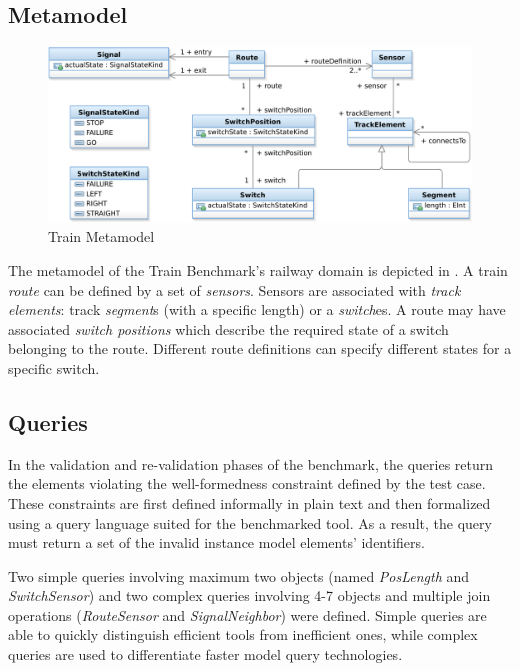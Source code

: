 \subsection{Metamodel}
\label{sec:domain}

\begin{figure}[htb!]
\begin{center}
\includegraphics[width=1\columnwidth]{figures/TrainMM.pdf}
\caption{Train Metamodel}
\label{fig:metamodel}
\end{center}
\end{figure}


The metamodel of the Train Benchmark's railway domain is depicted in . A train \emph{route} can be defined by a set of \emph{sensors}. Sensors are associated with \emph{track elements}: track \emph{segment}s (with a specific length) or a \emph{switch}es. A route may have associated \emph{switch positions} which describe the required state of a switch belonging to the route. Different route definitions can specify different states for a specific switch.
 
\subsection{Queries}
\label{sec:queries}

In the validation and re-validation phases of the benchmark, the queries return the elements violating the well-formedness constraint defined by the test case. These constraints are first defined informally in plain text and then formalized using a query language suited for the benchmarked tool. As a result, the query must return a set of the invalid instance model elements' identifiers.
 
Two simple queries involving maximum two objects (named \emph{PosLength} and \emph{SwitchSensor}) and two complex queries involving 4-7 objects and multiple join operations (\emph{RouteSensor} and \emph{SignalNeighbor}) were defined. Simple queries are able to quickly distinguish efficient tools from inefficient ones, while complex queries are used to differentiate faster model query technologies.
 
